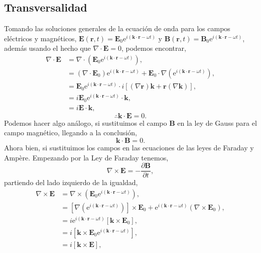 \documentclass[11pt,fleqn]{book} %
\begin{document}
\subsection{Transversalidad}
Tomando las soluciones generales de la ecuaci\'on de onda para los campos el\'ectricos y magn\'eticos, $\textbf{E}(\textbf{r},t)=\textbf{E}_0\text{e}^{i(\textbf{k}\cdot\textbf{r}- \omega t)}$
y $\textbf{B}(\textbf{r},t)=\textbf{B}_0\text{e}^{i(\textbf{k}\cdot\textbf{r}- \omega t)}$, adem\'as usando el hecho que $\nabla \cdot \textbf{E}=0 $, podemos encontrar,
\begin{equation*}
\begin{split}
\nabla\cdot\textbf{E}&=\nabla\cdot(\textbf{E}_0\text{e}^{i(\textbf{k}\cdot\textbf{r}- \omega t)}),\\
&=(\nabla\cdot\textbf{E}_0)\text{e}^{i(\textbf{k}\cdot\textbf{r}- \omega t)}+\textbf{E}_{0}\cdot\nabla(\text{e}^{i(\textbf{k}\cdot\textbf{r}- \omega t)}),\\
&=\textbf{E}_{0}\text{e}^{i(\textbf{k}\cdot\textbf{r}- \omega t)}\cdot i[(\nabla\textbf{r})\textbf{k}+\textbf{r}(\nabla\textbf{k})],\\
&=i\textbf{E}_{0}\text{e}^{i(\textbf{k}\cdot\textbf{r}- \omega t)}\cdot \textbf{k},\\
&=i\textbf{E}\cdot\textbf{k},
\end{split}
\end{equation*}
\begin{equation} \label{Cond1}
\therefore \textbf{k}\cdot\textbf{E}=0 .
\end{equation}
Podemos hacer algo an\'alogo, si sustituimos el campo $\textbf{B}$ en la ley de Gauss para el campo magn\'etico, llegando a la conclusi\'on,
\begin{equation} \label{Cond2}
\textbf{k}\cdot\textbf{B}=0.
\end{equation}
Ahora bien, si sustituimos los campos en las ecuaciones de las leyes de Faraday y Amp\`ere. Empezando por la Ley de Faraday tenemos,
\begin{equation*}
\nabla\times\textbf{E}=-\frac{\partial \textbf{B}}{\partial t},
\end{equation*}
partiendo del lado izquierdo de la igualdad,
\begin{equation*}
\begin{split}
\nabla\times\textbf{E}&=\nabla\times(\textbf{E}_0\text{e}^{i(\textbf{k}\cdot\textbf{r}- \omega t)}),\\
&=[\nabla(\text{e}^{i(\textbf{k}\cdot\textbf{r}- \omega t)})]\times\textbf{E}_0+\text{e}^{i(\textbf{k}\cdot\textbf{r}- \omega t)}(\nabla\times\textbf{E}_{0}),\\
&=i\text{e}^{i(\textbf{k}\cdot\textbf{r}- \omega t)}[\textbf{k}\times\textbf{E}_0],\\
&=i[\textbf{k}\times\textbf{E}_0\text{e}^{i(\textbf{k}\cdot\textbf{r}- \omega t)}],\\
&=i[\textbf{k}\times\textbf{E}],
\end{split}
\end{equation*}
\end{document}
